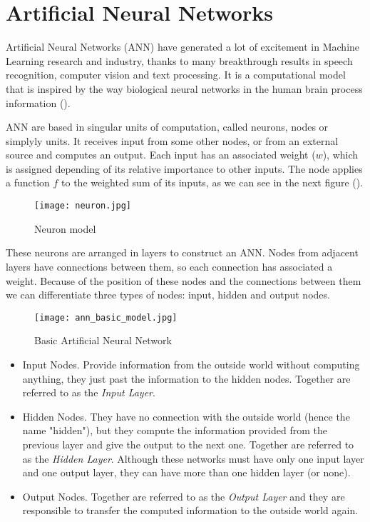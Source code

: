\section{Artificial Neural Networks}
Artificial Neural Networks (ANN) have generated a lot of excitement in Machine Learning research and industry, thanks to many breakthrough results in speech recognition, computer vision and text processing. It is a computational model that is inspired by the way biological neural networks in the human brain process information (\cite{intro_ann}). 

ANN are based in singular units of computation, called neurons, nodes or simplyly units. It receives input from some other nodes, or from an external source and computes an output. Each input has an associated weight ($w$), which is assigned depending of its relative importance to other inputs. The node applies a function $f$ to the weighted sum of its inputs, as we can see in the next figure (\cite{intro_ann}).

\begin{figure}[ht]
	\centering
	\texttt{[image: neuron.jpg]}
	\caption{Neuron model}
\end{figure}

These neurons are arranged in layers to construct an ANN. Nodes from adjacent layers have connections between them, so each connection has associated a weight. Because of the position of these nodes and the connections between them we can differentiate three types of nodes: input, hidden and output nodes. 

\begin{figure}[ht]
	\centering
	\texttt{[image: ann\_basic\_model.jpg]}
	\caption{Basic Artificial Neural Network}
\end{figure}

\begin{itemize}
	\item Input Nodes. Provide information from the outside world without computing anything, they just past the information to the hidden nodes. Together are referred to as the \textit{Input Layer}. 
	\item Hidden Nodes. They have no connection with the outside world (hence the name "hidden"), but they compute the information provided from the previous layer and give the output to the next one. Together are referred to as the \textit{Hidden Layer}. Although these networks must have only one input layer and one output layer, they can have more than one hidden layer (or none). 
	\item Output Nodes. Together are referred to as the \textit{Output Layer} and they are responsible to transfer the computed information to the outside world again.
\end{itemize}

